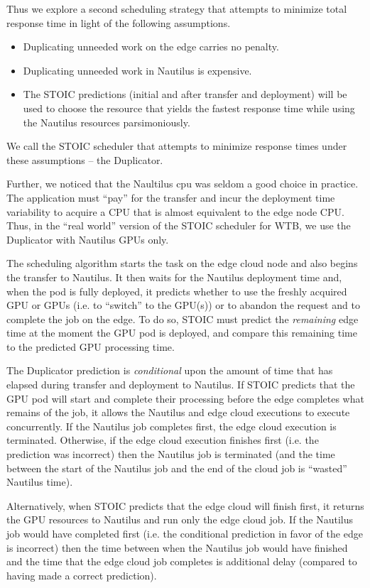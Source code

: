 Thus we explore a second scheduling strategy that attempts to minimize total
response time in light of the following assumptions.
\begin{itemize}
\item Duplicating unneeded work on the edge carries no penalty.
\item Duplicating unneeded work in Nautilus is expensive.
\item The STOIC predictions (initial and after transfer and deployment) will be used to
choose the resource that yields the fastest response time while using the
Nautilus resources parsimoniously.
\end{itemize}
We call the STOIC scheduler that attempts to minimize response times under these assumptions -- the Duplicator.

Further, we noticed that the Naultilus cpu was seldom a good choice in
practice. The application must ``pay'' for the transfer and incur the
deployment time variability to acquire a CPU that is almost equivalent to the
edge node CPU.  Thus, in the ``real world'' version of the STOIC scheduler for
WTB, we use the Duplicator with Nautilus GPUs only.

The scheduling algorithm starts the task on the edge cloud node and also
begins the transfer to Nautilus. It then waits for the Nautilus deployment
time and, when the pod is fully deployed, it predicts whether to use the
freshly acquired GPU or GPUs (i.e. to ``switch'' to the GPU(s)) or to abandon
the request and to complete the job on the edge.  To do so, STOIC must predict
the \textit{remaining} edge time at the moment the GPU pod is deployed, and
compare this remaining time to the predicted GPU processing time.  

The Duplicator prediction is \textit{conditional} upon the amount of time that
has elapsed during transfer and deployment to Nautilus. If STOIC predicts that
the GPU pod will start and complete their processing before the edge completes
what remains of the job, it allows the Nautilus and edge cloud executions to
execute concurrently. If the Nautilus job completes first, the edge cloud
execution is terminated.  Otherwise, if the edge cloud execution finishes
first (i.e. the prediction was incorrect) then the Nautilus job is terminated
(and the time between the start of the Nautilus job and the end of the cloud
job is ``wasted'' Nautilus time).

Alternatively, when STOIC predicts that the edge cloud will finish first, it
returns the GPU resources to Nautilus and run only the edge cloud job. If the
Nautilus job would have completed first (i.e. the conditional prediction in
favor of the edge is incorrect) then the time between when the Nautilus job
would have finished and the time that the edge cloud job completes is
additional delay (compared to having made a correct prediction).

